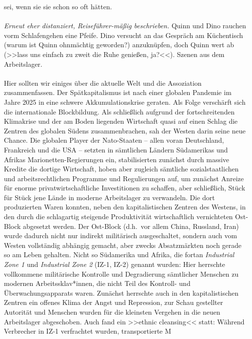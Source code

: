 sei, wenn sie sie schon so oft  hätten.\\\\
%
\emph{Erneut eher distanziert, Reiseführer-mäßig beschrieben.}
Quinn und Dino rauchen vorm Schlafengehen eine Pfeife. 
Dino versucht an das Gespräch am Küchentisch (warum ist Quinn ohnmächtig
geworden?) anzuknüpfen, doch Quinn wert ab (>>lass uns einfach zu zweit die Ruhe
genießen, ja?<<).
Szenen aus dem Arbeitslager.\\\\
% 
Hier sollten wir einiges über die aktuelle Welt und die Assoziation
zusammenfassen. 
Der Spätkapitalismus ist nach einer globalen Pandemie im Jahre 2025 in eine
schwere Akkumulationskrise geraten. 
Als Folge verschärft sich die internationale Blockbildung. 
Als schließlich aufgrund der fortschreitenden Klimakrise und der am Boden
liegenden Wirtschaft quasi auf einen Schlag die Zentren des globalen Südens
zusammenbrachen, sah der Westen darin seine neue Chance. 
Die globalen Player der Nato-Staaten -- allen voran Deutschland, Frankreich und
die USA -- setzten in sämtlichen Ländern Südamerikas und Afrikas
Marionetten-Regierungen ein, stabilisierten zunächst durch massive Kredite die
dortige Wirtschaft, hoben aber zugleich sämtliche sozialstaatlichen und
arbeitsrechtlichen Programme und Regulierungen auf, um zunächst Anreize für
enorme privatwirtschaftliche Investitionen zu schaffen, aber schließlich, Stück
für Stück jene Lände in moderne Arbeitslager zu verwandeln. 
Die dort produzierten Waren konnten, neben den kapitalistischen Zentren des
Westens, in den durch die schlagartig steigende Produktivität wirtschaftlich
vernichteten Ost-Block abgesetzt werden. 
Der Ost-Block (d.h.~vor allem China, Russland, Iran) wurde dadurch nicht nur
indirekt militärisch ausgeschaltet, sondern auch vom Westen vollständig abhängig
gemacht, aber zwecks Absatzmärkten noch gerade so am Leben gehalten.
Nicht so Südamerika und Afrika, die fortan \emph{Industrial Zone 1} und
\emph{Industrial Zone 2} (IZ-1, IZ-2) genannt wurden: 
Hier herrschte vollkommene militärische Kontrolle und Degradierung sämtlicher
Menschen zu modernen Arbeitssklav*innen, die nicht Teil des Kontroll- und
Überwachungsapparats waren.
Zunächst herrschte auch in den kapitalistischen Zentren ein offenes Klima der
Angst und Repression, zur Schau gestellter Autorität und Menschen wurden für die
kleinsten Vergehen in die neuen Arbeitslager abgeschoben. 
Auch fand ein >>ethnic cleansing<< statt: 
Während  Verbrecher in IZ-1 verfrachtet wurden, transportierte M
